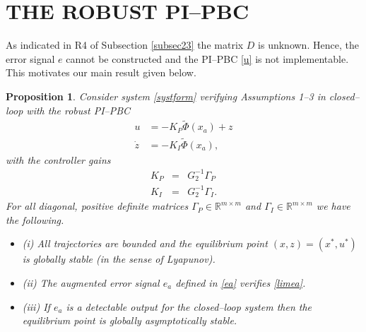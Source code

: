 \documentclass[10pt, conference]{ieeeconf}
\newtheorem{proposition}{Proposition}
\def\begequarr{\begin{eqnarray}}
\def\endequarr{\end{eqnarray}}
\def\lab{\label}
\def\begite{\begin{itemize}}
\def\endite{\end{itemize}}
\begin{document}
\section{THE ROBUST PI--PBC}
\lab{sec4}	
As indicated in R4 of Subsection \ref{subsec23} the matrix $D$ is unknown. Hence, the error signal $e$ cannot be constructed and the PI--PBC  \eqref{u} is not implementable.	
This motivates our main result given below.
\begin{proposition} \lab{pro1}
Consider system \eqref{systform} verifying Assumptions 1--3 in closed--loop with the robust PI--PBC
\begin{equation}\lab{unew}
	\begin{aligned}
		u &= - K_P  \widetilde{\Phi}(x_a) + z \\
		\dot{z} &= - K_I  \widetilde{\Phi}(x_a),
	\end{aligned}
\end{equation}
with the controller gains
\begequarr
\nonumber
K_P & = & G_2^{-1} \Gamma_P \\
K_I & = & G_2^{-1} \Gamma_I.
\lab{gaipi}
\endequarr
{\em For all} diagonal, positive definite matrices  $\Gamma_P \in \mathbb{R}^{m \times m}$ and $\Gamma_I \in \mathbb{R}^{m \times m}$  we have the following.
\begite
\item[(i)] All trajectories are bounded and the equilibrium point $(x,z)=(x^*,u^*)$ is {\em globally stable} (in the sense of Lyapunov).
\item[(ii)] The augmented error signal $e_a$ defined in \eqref{ea} verifies \eqref{limea}.  
\item[(iii)] If $e_a$ is a detectable output for the closed--loop system then the equilibrium point is globally {\em asymptotically} stable.
\endite
\end{proposition}
\end{document}
